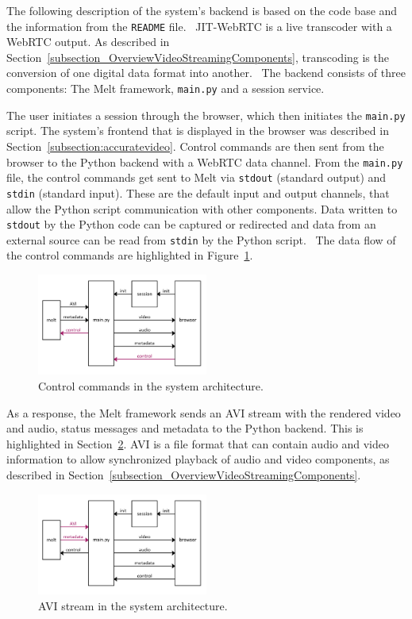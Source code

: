 \documentclass[../MasterThesis.tex]{subfiles}
\begin{document}
The following description of the system's backend is based on the code base and the information from the \texttt{README} file.~\cite{RM_Backend}
JIT-WebRTC is a live transcoder with a WebRTC output. As described in Section~\ref{subsection_OverviewVideoStreamingComponents}, transcoding is the conversion of one digital data format into another.~\cite{transcoding}
The backend consists of three components: The Melt framework, \texttt{main.py} and a session service.


The user initiates a session through the browser, which then initiates the \texttt{main.py} script. The system's frontend that is displayed in the browser was described in Section~\ref{subsection:accuratevideo}.
Control commands are then sent from the browser to the Python backend with a WebRTC data channel.
From the \texttt{main.py} file, the control commands get sent to Melt via \texttt{stdout} (standard output) and \texttt{stdin} (standard input). These are the default input and output channels, that allow the Python script communication with other components.
Data written to \texttt{stdout} by the Python code can be captured or redirected and data from an external source can be read from \texttt{stdin} by the Python script.~\cite{python} The data flow of the control commands are highlighted in Figure~\ref{figure:controlcommands}.

\begin{figure}[H]
	\centering
	\includegraphics[width=0.5\textwidth]{IM_control.png}
	\caption{Control commands in the system architecture.}
	\label{figure:controlcommands}
\end{figure}


As a response, the Melt framework sends an AVI stream with the rendered video and audio, status messages and metadata to the Python backend. This is highlighted in Section~\ref{figure:avimetadata}.
AVI is a file format that can contain audio and video information to allow synchronized playback of audio and video components, as described in Section~\ref{subsection_OverviewVideoStreamingComponents}.~\cite{avi} 

\begin{figure}[H]
	\centering
	\includegraphics[width=0.5\textwidth]{IM_avi.png}
	\caption{AVI stream in the system architecture.}
	\label{figure:avimetadata}
\end{figure}
\end{document}

